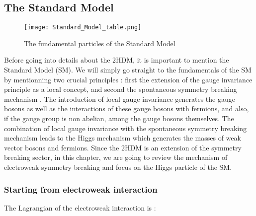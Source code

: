 \documentclass [12pt] {article}
\numberwithin{equation}{section} %
\numberwithin{figure}{section}   %
\begin{document}
\subsection{The Standard Model}

\begin{figure}[H]
    \centering
    \texttt{[image: Standard\_Model\_table.png]}
    \caption{The fundamental particles of the Standard Model}
    \label{prod}
\end{figure}

Before going into details about the 2HDM, it is important to mention the Standard Model (SM). We will simply go straight to the fundamentals of the SM by mentionning two crucial principles : first the extension of the gauge invariance principle as a local concept, and second the spontaneous symmetry breaking mechanism . The introduction of local gauge invariance generates the gauge bosons as well as the interactions of these gauge bosons with fermions, and also, if the gauge group is non abelian, among the gauge bosons themselves. The combination of local gauge invariance with the spontaneous symmetry breaking mechanism leads to the Higgs mechanism which generates the masses of weak vector bosons and fermions. Since the 2HDM is an extension of the symmetry breaking sector, in this chapter, we are going to review the mechanism of electroweak symmetry breaking and focus on the Higgs particle of the SM.

\subsubsection{Starting from electroweak interaction}

The Lagrangian of the electroweak interaction is :
\end{document}
